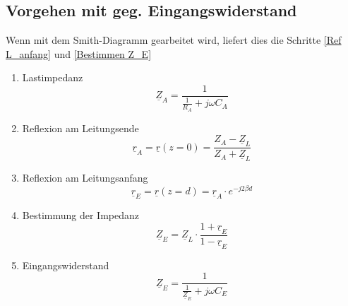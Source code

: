 \subsection{Vorgehen mit geg. Eingangswiderstand}
Wenn mit dem Smith-Diagramm gearbeitet wird, liefert dies die Schritte
\ref{Ref L_anfang} und \ref{Bestimmen Z_E}
\begin{enumerate}
	\item Lastimpedanz
	      \[ \underline{Z}_A = \dfrac{1}{\frac{1}{R_A} + j \omega C_A} \]
	\item Reflexion am Leitungsende
	      \[ \underline{r}_A = \underline{r}(z=0) = \dfrac{Z_A - \underline{Z}_L}{Z_A + \underline{Z}_L} \]
	\item Reflexion am Leitungsanfang \label{Ref L_anfang}
	      \[ \underline{r}_E = \underline{r}(z=d) =  \underline{r}_A \cdot e^{-j 2 \beta d}\]
	\item Bestimmung der Impedanz \label{Bestimmen Z_E}
	      \[ \underline{Z}_E = \underline{Z}_L \cdot \dfrac{1 + \underline{r}_E}{1 - \underline{r}_E}\]
	\item Eingangswiderstand
	      \[ \underline{Z}_E = \dfrac{1}{\frac{1}{\underline{Z}_E} + j \omega C_E}\]
\end{enumerate}

